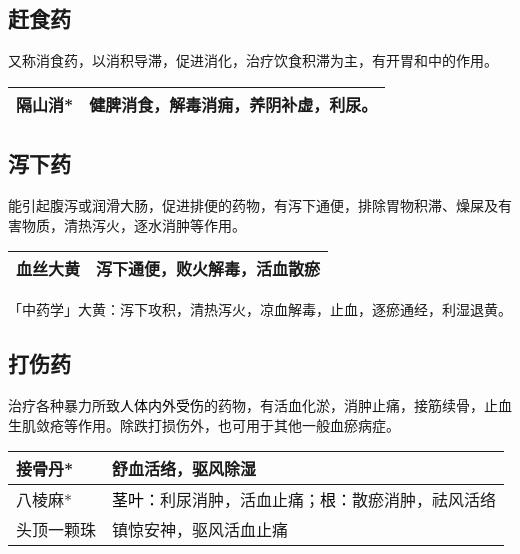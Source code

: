 \documentclass[cn,black,12pt,normal,founder]{elegantnote}
\newcommand{\redt}[1]{\textcolor{black}{{}#1}}      %
\begin{document}
\subsection{赶食药}

又称消食药，以消积导滞，促进消化，治疗饮食积滞为主，有开胃和中的作用。

\begin{table}[H]
  \begin{tabular}{|l|l|}
  \hline
  隔山消* & 健脾消食，解毒消痈，养阴补虚，利尿。 \\ \hline
  \end{tabular}
\end{table}

\subsection{泻下药}

能引起腹泻或润滑大肠，促进排便的药物，有泻下通便，排除胃物积滞、燥屎及有害物质，清热泻火，逐水消肿等作用。


\begin{table}[H]
  \begin{tabular}{|l|l|}
  \hline
  血丝大黄 & 泻下通便，败火解毒，活血散瘀  \\ \hline
  \end{tabular}
\end{table}

\begin{note}
「中药学」大黄：泻下攻积，清热泻火，凉血解毒，止血，逐瘀通经，利湿退黄。
\end{note}

\subsection{打伤药}

治疗各种暴力所致\redt{人体内外受伤}的药物，有活血化淤，消肿止痛，接筋续骨，止血生肌敛疮等作用。除跌打损伤外，也可用于其他一般血瘀病症。

\begin{table}[H]
  \begin{tabular}{|l|l|}
  \hline
  接骨丹* & 舒血活络，驱风除湿 \\ \hline
  八棱麻* & \redt{茎叶：}利尿消肿，活血止痛；\redt{根：}散瘀消肿，祛风活络 \\ \hline
  头顶一颗珠 & 镇惊安神，驱风活血止痛 \\ \hline
  \end{tabular}
\end{table}
\end{document}
